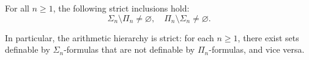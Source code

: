 For all $n \geq 1$, the following strict inclusions hold:
$$\Sigma_n \setminus \Pi_n \neq \varnothing, \quad \Pi_n \setminus \Sigma_n \neq \varnothing.$$

In particular, the arithmetic hierarchy is strict: for each $n \geq 1$, there exist sets definable by $\Sigma_n$-formulas that are not definable by $\Pi_n$-formulas, and vice versa.
